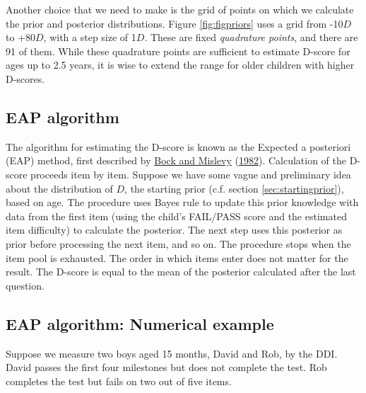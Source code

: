 \documentclass[
]{book}
\begin{document}
Another choice that we need to make is the grid of points on which we calculate the prior and posterior distributions. Figure \ref{fig:figpriors} uses a grid from -10\(D\) to +80\(D\), with a step size of 1\(D\). These are fixed \emph{quadrature points}, and there are 91 of them. While these quadrature points are sufficient to estimate D-score for ages up to 2.5 years, it is wise to extend the range for older children with higher D-scores.

\hypertarget{sec:EAP}{%
\subsection{EAP algorithm}\label{sec:EAP}}

The algorithm for estimating the D-score is known as the Expected a posteriori (EAP) method, first described by \protect\hyperlink{ref-bock1982}{Bock and Mislevy} (\protect\hyperlink{ref-bock1982}{1982}). Calculation of the D-score proceeds item by item. Suppose we have some vague and preliminary idea about the distribution of \(D\), the starting prior (c.f. section \ref{sec:startingprior}), based on age. The procedure uses Bayes rule to update this prior knowledge with data from the first item (using the child's FAIL/PASS score and the estimated item difficulty) to calculate the posterior. The next step uses this posterior as prior before processing the next item, and so on. The procedure stops when the item pool is exhausted. The order in which items enter does not matter for the result. The D-score is equal to the mean of the posterior calculated after the last question.

\hypertarget{eap-algorithm-numerical-example}{%
\subsection{EAP algorithm: Numerical example}\label{eap-algorithm-numerical-example}}

Suppose we measure two boys aged 15 months, David and Rob, by the DDI. David passes the first four milestones but does not complete the test. Rob completes the test but fails on two out of five items.
\end{document}

